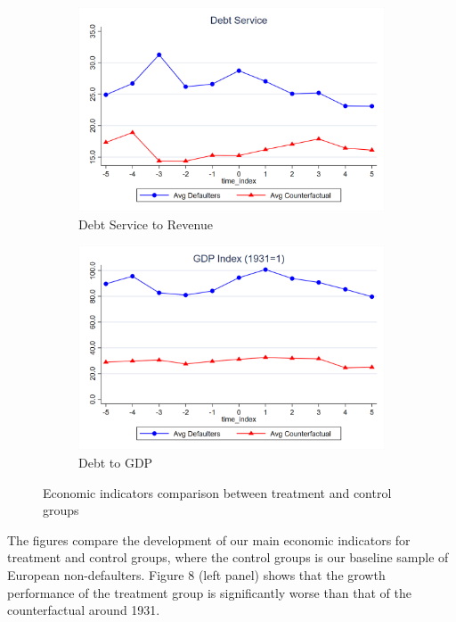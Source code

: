 \begin{figure}[ht!]
\begin{subfigure}[b]{0.48\textwidth}
        \includegraphics[width=\textwidth]{figures/figc5_c.png}
        \caption{Debt Service to Revenue}
        \label{fig:c5c}
    \end{subfigure}
    \hfill
    \begin{subfigure}[b]{0.48\textwidth}
        \centering
        \includegraphics[width=\textwidth]{figures/figc5_d.png}
        \caption{Debt to GDP}
        \label{fig:c5d}
    \end{subfigure}
    \caption{Economic indicators comparison between treatment and control groups}
    \label{fig:c5}
\end{figure}

The figures compare the development of our main economic indicators for treatment and control groups,
where the control groups is our baseline sample of European non-defaulters.
Figure 8 (left panel) shows that the growth performance of the treatment group is significantly worse
than that of the counterfactual around 1931. 

